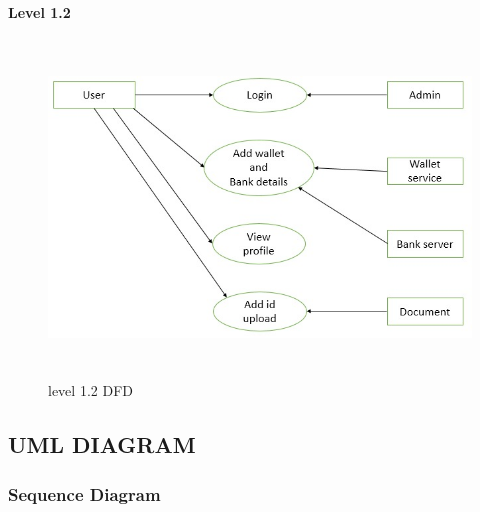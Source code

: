 \documentclass[12pt]{article}
\begin{document}
\begin{flushleft}\textbf{Level 1.2}\end{flushleft}


\begin{figure}[h!]
\begin{center}
\includegraphics[width=16cm, height=9cm]{DFD1.2}
\caption{level 1.2 DFD}
\end{center}
\end{figure}








\newpage





\subsection{UML DIAGRAM}

\subsubsection{Sequence Diagram}
\end{document}
